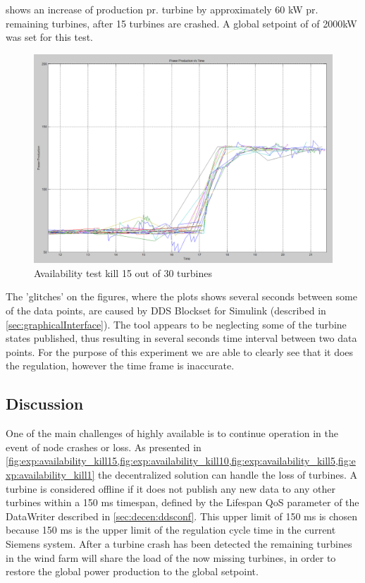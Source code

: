 \FloatBarrier
{} shows an increase of production pr. turbine by approximately 60 kW pr. remaining turbines, after 15 turbines are crashed. A global setpoint of of 2000kW was set for this test.

\begin{figure}[!h]
	\centering
	\includegraphics[width=\resultsFigureWidthScale\textwidth]{figures/Results/availabilitytest30-15_setpoint_2000.PNG}
	\caption{Availability test kill 15 out of 30 turbines}
	\label{fig:exp:availability_kill15}
\end{figure}

\FloatBarrier

The 'glitches' on the figures, where the plots shows several seconds between some of the data points, are caused by DDS Blockset for Simulink (described in \cref{sec:graphicalInterface}). The tool appears to be neglecting some of the turbine states published, thus resulting in several seconds time interval between two data points. For the purpose of this experiment we are able to clearly see that it does the regulation, however the time frame is inaccurate.

\subsection{Discussion}
One of the main challenges of highly available is to continue operation in the event of node crashes or loss. As presented in  \cref{fig:exp:availability_kill15,fig:exp:availability_kill10,fig:exp:availability_kill5,fig:exp:availability_kill1} the decentralized solution can handle the loss of turbines. A turbine is considered offline if it does not publish any new data to any other turbines within a 150 ms timespan, defined by the Lifespan QoS parameter of the DataWriter described in \cref{sec:decen:ddsconf}.
This upper limit of 150 ms is chosen because 150 ms is the upper limit of the regulation cycle time in the current Siemens system.
After a turbine crash has been detected the remaining turbines in the wind farm will share the load of the now missing turbines, in order to restore the global power production to the global setpoint.

